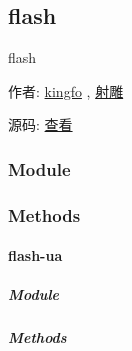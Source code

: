 \documentclass[letterpaper,10pt,english]{sphinxmanual}
\begin{document}
\label{api/component/flash/index:module-flash}

\subsection{flash}
\label{api/component/flash/index:flash}\label{api/component/flash/index::doc}
\begin{DUlineblock}{0em}
\item[] flash
\item[] 作者: \href{mailto:oicuicu@gmail.com}{kingfo} , \href{mailto:lifesinger@gmail.com}{射雕}
\item[] 源码: \href{https://github.com/kissyteam/kissy/tree/master/src/flash}{查看}
\end{DUlineblock}


\subsubsection{Module}
\label{api/component/flash/index:module}\begin{quote}

{\hyperref[api/component/flash/index:module-flash]{}}
\end{quote}


\subsubsection{Methods}
\label{api/component/flash/index:methods}

\paragraph{flash-ua}
\label{api/component/flash/flash-ua:flash-ua}\label{api/component/flash/flash-ua::doc}

\subparagraph{Module}
\label{api/component/flash/flash-ua:module}\begin{quote}

{\hyperref[api/component/flash/index:module-flash]{}}
\end{quote}


\subparagraph{Methods}
\label{api/component/flash/flash-ua:methods}
\end{document}
